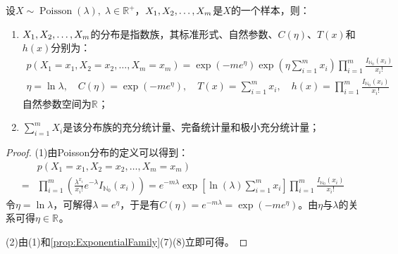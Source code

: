 \begin{theorem}
	设$X\sim\operatorname{Poisson}(\lambda),\;\lambda\in\mathbb{R}^+$，$X_1, X_2, \dots, X_{m}$是$X$的一个样本，则：
	\begin{enumerate}
		\item $X_1, X_2, \dots, X_{m}$的分布是指数族，其标准形式、自然参数、$C(\eta)$、$T(x)$和$h(x)$分别为：
		\begin{gather*}
			p(X_1=x_1,X_2=x_2,\dots,X_m=x_m)=\exp(-me^{\eta})\exp\left(\eta\sum_{i=1}^{m}x_i\right)\prod_{i=1}^{m}\frac{I_{\mathbb{N}_0}(x_i)}{x_i!} \\
			\eta=\ln\lambda,\quad C(\eta)=\exp(-me^{\eta}),\quad T(x)=\sum_{i=1}^{m}x_i,\quad h(x)=\prod_{i=1}^{m}\frac{I_{\mathbb{N}_0}(x_i)}{x_i!}
		\end{gather*}
		自然参数空间为$\mathbb{R}^{}$；
		\item $\sum\limits_{i=1}^{m}X_i$是该分布族的充分统计量、完备统计量和极小充分统计量；
	\end{enumerate}
\end{theorem}
\begin{proof}
	(1)由Poisson分布的定义可以得到：
	\begin{align*}
		&p(X_1=x_1,X_2=x_2,\dots,X_m=x_m) \\
		=&\prod_{i=1}^{m}\left(\frac{\lambda^{x_i}}{x_i!}e^{-\lambda}I_{\mathbb{N}_0}(x_i)\right) =e^{-m\lambda}\exp\left[\ln(\lambda)\sum_{i=1}^{m}x_i\right]\prod_{i=1}^{m}\frac{I_{\mathbb{N}_0}(x_i)}{x_i!}
	\end{align*}
	令$\eta=\ln\lambda$，可解得$\lambda=e^{\eta}$，于是有$C(\eta)=e^{-m\lambda}=\exp(-me^{\eta})$。由$\eta$与$\lambda$的关系可得$\eta\in\mathbb{R}^{}$。\par
	(2)由(1)和\cref{prop:ExponentialFamily}(7)(8)立即可得。
\end{proof}

